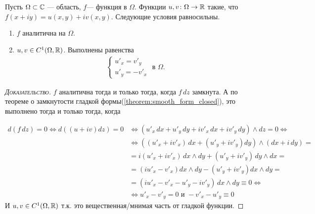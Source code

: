\documentclass[../complex-analysis.tex]{subfiles}
\begin{document}
\begin{thm}
\label{theorem:cauchy_riman}
 Пусть $ \Omega \subset \mathbb{C} $ --- область, $ f $--- функция в $ \Omega $. Функции $ u, v \colon \Omega \to \mathbb{R} $ такие, что $ f(x + iy) = u(x, y) + iv(x,y) $. Следующие условия равносильны.
 \begin{enumerate}
  \item $ f $ аналитична на $ \Omega $.
  \item $ u,v \in C^{1}(\Omega, \mathbb{R}) $. Выполнены равенства
   \begin{align*}
    \begin{cases}
     u'_x = v'_y \\
     u'_y = -v'_x
 \end{cases} \text{ в } \Omega.
   \end{align*}
 \end{enumerate}
\end{thm}
\begin{proof}[\normalfont\textsc{Доказательство}]
$ f $ аналитична тогда и только тогда, когда $ f \, dz $ замкнута. А по теореме о замкнутости гладкой формы(\ref{theorem:smooth_form_closed}), это выполнено тогда и только тогда, когда 
 
\begin{align*}
d(f\,dz) = 0 \iff d((u+iv)dz) = 0 &\iff (u'_x\,dx+u'_y\,dy+iv'_x\,dx+iv'_y\,dy) \land dz = 0 \iff \\
&\iff ((u'_x + iv'_x)\,dx + (u'_y + iv'_y)dy) \land (dx + i\,dy) = \\
& = i(u'_x + iv'_x)\,dx \land dy +  (u'_y + iv'_y)\,dy\land dx = \\
& = (i u'_x - v'_x) dx \land dy - (u'_y + iv'_y) dx \land dy = \\
& = (iu'_x - v'_x - u'_y - iv'_y)\,dx \land dy \equiv 0 \iff \\
& \iff u'_x - v'_y = 0 \text{ и } -v'_x - u'_y \equiv 0
\end{align*} 
И $u, v \in C^1(\Omega, \mathbb{R})$ т.к. это вещественная/мнимая часть от гладкой функции. 
\end{proof}
\end{document}
